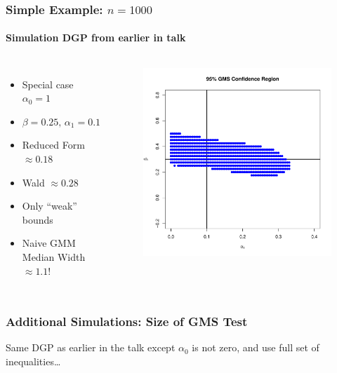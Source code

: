 \documentclass{beamer}
\begin{document}
\begin{frame}
  \frametitle{Simple Example: $n = 1000$}
  \framesubtitle{Simulation DGP from earlier in talk}
  \begin{columns}
    \footnotesize
    \begin{itemize}
      \item Special case $\alpha_0 = 1$
      \item $\beta = 0.25,\, \alpha_1 = 0.1$
      \item Reduced Form $\approx 0.18$
      \item Wald $\approx 0.28$
      \item Only ``weak'' bounds
      \item Naive GMM Median Width $\approx 1.1$!

    \end{itemize}
  \begin{figure}
    \centering
    \includegraphics[scale=0.35]{GMS.pdf}
  \end{figure}
  \end{columns}
\end{frame}
\begin{frame}
  \frametitle{Additional Simulations: Size of GMS Test}
  Same DGP as earlier in the talk except $\alpha_0$ is not zero, and use full set of inequalities\ldots
\end{frame}
\end{document}
